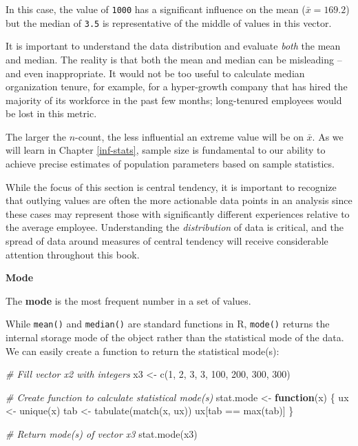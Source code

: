 \documentclass[
]{book}
\newenvironment{Shaded}{\begin{snugshade}}{\end{snugshade}}
\newcommand{\CommentTok}[1]{\textcolor[rgb]{0.56,0.35,0.01}{\textit{#1}}}
\newcommand{\ControlFlowTok}[1]{\textcolor[rgb]{0.13,0.29,0.53}{\textbf{#1}}}
\newcommand{\DecValTok}[1]{\textcolor[rgb]{0.00,0.00,0.81}{#1}}
\newcommand{\FunctionTok}[1]{\textcolor[rgb]{0.00,0.00,0.00}{#1}}
\newcommand{\NormalTok}[1]{#1}
\newcommand{\OtherTok}[1]{\textcolor[rgb]{0.56,0.35,0.01}{#1}}
\newcommand{\SpecialCharTok}[1]{\textcolor[rgb]{0.00,0.00,0.00}{#1}}
\begin{document}
In this case, the value of \texttt{1000} has a significant influence on the mean (\(\bar{x} = 169.2\)) but the median of \texttt{3.5} is representative of the middle of values in this vector.

It is important to understand the data distribution and evaluate \emph{both} the mean and median. The reality is that both the mean and median can be misleading -- and even inappropriate. It would not be too useful to calculate median organization tenure, for example, for a hyper-growth company that has hired the majority of its workforce in the past few months; long-tenured employees would be lost in this metric.

The larger the \(n\)-count, the less influential an extreme value will be on \(\bar{x}\). As we will learn in Chapter \ref{inf-stats}, sample size is fundamental to our ability to achieve precise estimates of population parameters based on sample statistics.

While the focus of this section is central tendency, it is important to recognize that outlying values are often the more actionable data points in an analysis since these cases may represent those with significantly different experiences relative to the average employee. Understanding the \emph{distribution} of data is critical, and the spread of data around measures of central tendency will receive considerable attention throughout this book.

\textbf{Mode}

The \textbf{mode} is the most frequent number in a set of values.

While \texttt{mean()} and \texttt{median()} are standard functions in R, \texttt{mode()} returns the internal storage mode of the object rather than the statistical mode of the data. We can easily create a function to return the statistical mode(s):

\begin{Shaded}
\begin{Highlighting}[]
\CommentTok{\# Fill vector x2 with integers}
\NormalTok{x3 }\OtherTok{\textless{}{-}} \FunctionTok{c}\NormalTok{(}\DecValTok{1}\NormalTok{, }\DecValTok{2}\NormalTok{, }\DecValTok{3}\NormalTok{, }\DecValTok{3}\NormalTok{, }\DecValTok{100}\NormalTok{, }\DecValTok{200}\NormalTok{, }\DecValTok{300}\NormalTok{, }\DecValTok{300}\NormalTok{)}

\CommentTok{\# Create function to calculate statistical mode(s)}
\NormalTok{stat.mode }\OtherTok{\textless{}{-}} \ControlFlowTok{function}\NormalTok{(x) \{}
\NormalTok{  ux }\OtherTok{\textless{}{-}} \FunctionTok{unique}\NormalTok{(x)}
\NormalTok{  tab }\OtherTok{\textless{}{-}} \FunctionTok{tabulate}\NormalTok{(}\FunctionTok{match}\NormalTok{(x, ux))}
\NormalTok{  ux[tab }\SpecialCharTok{==} \FunctionTok{max}\NormalTok{(tab)]}
\NormalTok{\}}

\CommentTok{\# Return mode(s) of vector x3}
\FunctionTok{stat.mode}\NormalTok{(x3)}
\end{Highlighting}
\end{Shaded}
\end{document}
